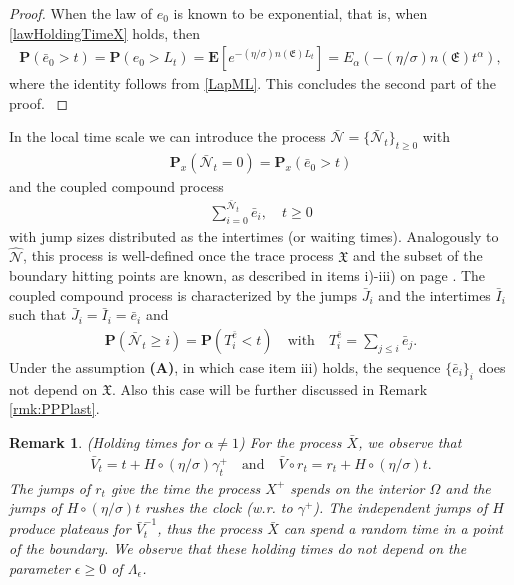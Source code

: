 \documentclass[11pt,a4paper]{article}
\newtheorem{remark}{Remark}[section]
\newcommand{\magenta}{black}
\begin{document}
\begin{proof}
{\color{\magenta} When the law of $e_0$ is known to be exponential, that is, when \eqref{lawHoldingTimeX} holds, then 
\begin{align*}
\mathbf{P}(\bar{e}_0 > t) = \mathbf{P}(e_0 > L_t) = \mathbf{E} [ e^{-(\eta/\sigma) n(\mathfrak{E}) L_t} ] = E_\alpha(-(\eta/\sigma) n(\mathfrak{E}) t^\alpha),
\end{align*}
where the identity follows from \eqref{LapML}. This concludes the second part of the proof.
}

\end{proof}


{\color{\magenta}
In the local time scale we can introduce the process $\bar{\mathcal{N}} = \{\bar{\mathcal{N}}_t\}_{t\geq 0}$ with
\begin{align*}
\mathbf{P}_x(\bar{\mathcal{N}}_t = 0 ) = \mathbf{P}_x(\bar{e}_0 >t)
\end{align*}
and the coupled compound process 
\begin{align*}
\sum_{i=0}^{\bar{\mathcal{N}}_t} \bar{e}_i, \quad t \geq 0
\end{align*}
with jump sizes distributed as the intertimes (or waiting times). Analogously to $\hat{\mathcal{N}}$, this process is well-defined once the trace process $\mathfrak{X}$ and the subset of the boundary hitting points are known, as described in items i)-iii) on page  \pageref{propertiesSeqSHT}. The coupled compound process is characterized by the jumps $\bar{J}_i$ and the intertimes $\bar{I}_i$ such that $\bar{J}_i = \bar{I}_i = \bar{e}_i$ and 
\begin{align*}
\mathbf{P}(\bar{\mathcal{N}}_t \geq i) = \mathbf{P}(T^{\bar{e}}_i < t) \quad \textrm{with} \quad T^{\bar{e}}_i = \sum_{j \leq i} \bar{e}_j.
\end{align*} 
Under the assumption {\bf (A)}, in which case item iii) holds, the sequence $\{\bar{e}_i\}_i$ does not depend on $\mathfrak{X}$. Also this case will be further discussed in Remark \ref{rmk:PPPlast}.  

}

\begin{remark}
\label{rmk:HTbarX}
(Holding times for $\alpha \neq 1$) For the process $\bar{X}$, we observe that \begin{align*}
\bar{V}_t = t + H \circ (\eta/\sigma) \gamma^+_t \quad \textrm{and} \quad \bar{V}\circ r_t = r_t + H \circ (\eta/\sigma) t.
\end{align*}
The jumps of $r_t$ give the time the process $X^+$ spends on the interior $\Omega$ and the jumps of $H \circ (\eta/\sigma) t$ rushes the clock (w.r. to $\gamma^+$). The independent jumps of $H$ produce plateaus for $\bar{V}^{-1}_t$, thus the process $\bar{X}$ can spend a random time in a point of the boundary. We observe that these holding times do not depend on the parameter $\epsilon\geq 0$ of $\Lambda_\epsilon$. 
\end{remark} 
\end{document}
